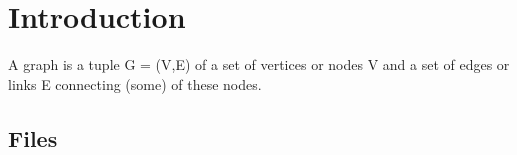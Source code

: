 \chapter{Introduction}
A graph is a tuple G = (V,E) of a set of vertices or nodes V and a set of edges or links E connecting (some) of these nodes. 

\section{Files}



